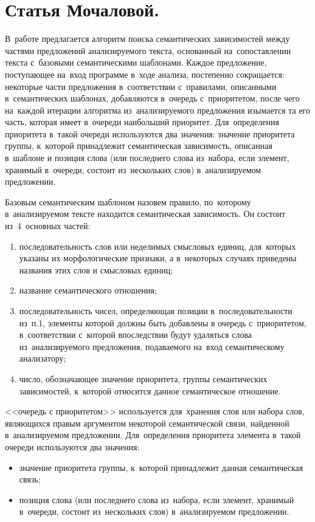 \documentclass[12pt]{article}
\theoremstyle{definition}
\theoremstyle{remark}
\numberwithin{equation}{section}
\begin{document}
\section{Статья Мочаловой.}
В~работе предлагается алгоритм поиска семантических зависимостей
между частями предложений анализируемого текста, основанный
на~сопоставлении текста с~базовыми семантическими шаблонами.
Каждое предложение, поступающее на~вход программе в~ходе анализа,
постепенно сокращается: некоторые части предложения в~соответствии
с~правилами, описанными в~семантических шаблонах, добавляются
в~очередь с~приоритетом, после чего на~каждой итерации алгоритма
из~анализируемого предложения изымается та его часть, которая
имеет в~очереди наибольший приоритет. Для~определения приоритета
в~такой очереди используются два значения: значение приоритета
группы, к~которой принадлежит семантическая зависимость, описанная
в~шаблоне и позиция слова (или последнего слова из~набора, если
элемент, хранимый в~очереди, состоит из~нескольких слов)
в~анализируемом предложении.

Базовым семантическим шаблоном назовем правило, по~которому
в~анализируемом тексте находится семантическая зависимость.
Он состоит из~4~основных частей:
\begin{enumerate}
    \item последовательность слов или неделимых смысловых единиц,
    для~которых указаны их морфологические признаки, а в~некоторых
    случаях приведены названия этих слов и смысловых единиц;
    \item название семантического отношения;
    \item последовательность чисел, определяющая позиции
    в~последовательности из~п.1, элементы которой должны быть
    добавлены в очередь с~приоритетом, в~соответствии с~которой
    впоследствии будут удаляться слова из~анализируемого предложения,
    подаваемого на~вход семантическому анализатору;
    \item число, обозначающее значение приоритета, группы
    семантических зависимостей, к~которой относится данное
    семантическое отношение.
\end{enumerate}

<<очередь с приоритетом>> используется для~хранения слов или
набора слов, являющихся правым аргументом некоторой семантической
связи, найденной в~анализируемом предложении. Для~определения
приоритета элемента в~такой очереди используются два значения:
\begin{itemize}
    \item значение приоритета группы, к~которой принадлежит
    данная семантическая связь;
    \item позиция слова (или последнего слова из~набора,
    если элемент, хранимый в~очереди, состоит из~нескольких слов)
    в~анализируемом предложении.
\end{itemize}
\end{document}
